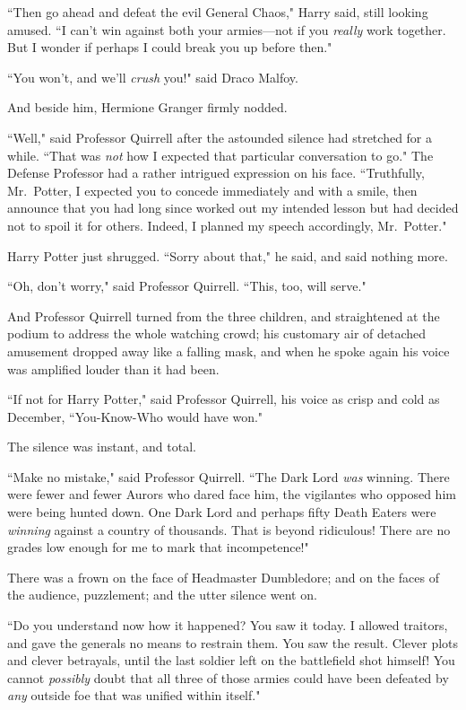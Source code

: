 ``Then go ahead and defeat the evil General Chaos," Harry said, still looking amused. ``I can't win against both your armies---not if you \emph{really} work together. But I wonder if perhaps I could break you up before then."

``You won't, and we'll \emph{crush} you!" said Draco Malfoy.

And beside him, Hermione Granger firmly nodded.

``Well," said Professor Quirrell after the astounded silence had stretched for a while. ``That was \emph{not} how I expected that particular conversation to go." The Defense Professor had a rather intrigued expression on his face. ``Truthfully, Mr.~Potter, I expected you to concede immediately and with a smile, then announce that you had long since worked out my intended lesson but had decided not to spoil it for others. Indeed, I planned my speech accordingly, Mr.~Potter."

Harry Potter just shrugged. ``Sorry about that," he said, and said nothing more.

``Oh, don't worry," said Professor Quirrell. ``This, too, will serve."

And Professor Quirrell turned from the three children, and straightened at the podium to address the whole watching crowd; his customary air of detached amusement dropped away like a falling mask, and when he spoke again his voice was amplified louder than it had been.

``If not for Harry Potter," said Professor Quirrell, his voice as crisp and cold as December, ``You-Know-Who would have won."

The silence was instant, and total.

\later

``Make no mistake," said Professor Quirrell. ``The Dark Lord \emph{was} winning. There were fewer and fewer Aurors who dared face him, the vigilantes who opposed him were being hunted down. One Dark Lord and perhaps fifty Death Eaters were \emph{winning} against a country of thousands. That is beyond ridiculous! There are no grades low enough for me to mark that incompetence!"

There was a frown on the face of Headmaster Dumbledore; and on the faces of the audience, puzzlement; and the utter silence went on.

``Do you understand now how it happened? You saw it today. I allowed traitors, and gave the generals no means to restrain them. You saw the result. Clever plots and clever betrayals, until the last soldier left on the battlefield shot himself! You cannot \emph{possibly} doubt that all three of those armies could have been defeated by \emph{any} outside foe that was unified within itself."

